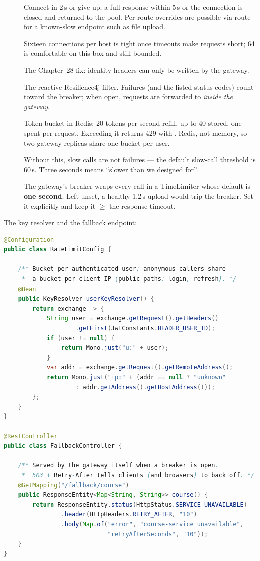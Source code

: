 \begin{description}
  \item[] Connect in 2\,s or give up; a full response within 5\,s
  or the connection is closed and returned to the pool. Per-route
  overrides are possible via route  for a known-slow
  endpoint such as file upload.
  \item[] Sixteen connections per host is tight once timeouts
  make requests short; 64 is comfortable on this box and still bounded.
  \item[] The Chapter~28 fix: identity headers can only be
  written by the gateway.
  \item[] The reactive Resilience4j filter. Failures (and the
  listed status codes) count toward the breaker; when open, requests are
  forwarded to  \emph{inside the gateway}.
  \item[] Token bucket in Redis: 20 tokens per second refill, up
  to 40 stored, one spent per request. Exceeding it returns 429 with
  . Redis, not memory, so two gateway
  replicas share one bucket per user.
  \item[] Without this, slow calls are not failures --- the
  default slow-call threshold is 60\,s. Three seconds means ``slower
  than we designed for''.
  \item[] The gateway's breaker wraps every call in a
  TimeLimiter whose default is \textbf{one second}. Left unset, a
  healthy 1.2\,s upload would trip the breaker. Set it explicitly and
  keep it $\ge$ the response timeout.
\end{description}

The key resolver and the fallback endpoint:

\begin{lstlisting}[language=Java]
@Configuration
public class RateLimitConfig {

    /** Bucket per authenticated user; anonymous callers share
     *  a bucket per client IP (public paths: login, refresh). */
    @Bean
    public KeyResolver userKeyResolver() {
        return exchange -> {
            String user = exchange.getRequest().getHeaders()
                    .getFirst(JwtConstants.HEADER_USER_ID);
            if (user != null) {
                return Mono.just("u:" + user);
            }
            var addr = exchange.getRequest().getRemoteAddress();
            return Mono.just("ip:" + (addr == null ? "unknown"
                    : addr.getAddress().getHostAddress()));
        };
    }
}

@RestController
public class FallbackController {

    /** Served by the gateway itself when a breaker is open.
     *  503 + Retry-After tells clients (and browsers) to back off. */
    @GetMapping("/fallback/course")
    public ResponseEntity<Map<String, String>> course() {
        return ResponseEntity.status(HttpStatus.SERVICE_UNAVAILABLE)
                .header(HttpHeaders.RETRY_AFTER, "10")
                .body(Map.of("error", "course-service unavailable",
                             "retryAfterSeconds", "10"));
    }
}
\end{lstlisting}

